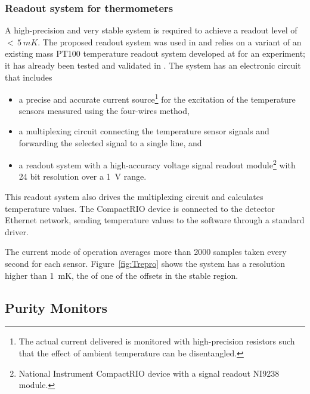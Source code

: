 \subsubsection{Readout system for thermometers}
\label{sec:fdgen-slow-cryo-therm-readout}

A %
high-precision and very stable system is required to achieve a readout level of $<\,\SI{5}{mK}$.
The proposed readout system was used in  and relies on a variant of an existing mass PT100 temperature readout system developed at
 for an  experiment; it has already been tested and validated in .
The system has an electronic circuit that includes
\begin{itemize}
\item a precise and accurate current source\footnote{The actual current delivered is monitored with high-precision resistors such that the effect of ambient temperature can be disentangled.} for the excitation of the temperature sensors measured using the four-wires method, 
\item a multiplexing circuit connecting the temperature sensor signals and forwarding the selected signal to a single line, and 
\item a readout system  with a high-accuracy voltage signal readout module\footnote{National Instrument CompactRIO\texttrademark{} device  with a signal readout NI9238\texttrademark{} module.} with 24 bit resolution over a \SI{1}{V} range.
\end{itemize}
This readout system also drives the multiplexing circuit and calculates temperature values. The CompactRIO device is connected to the detector Ethernet network, sending temperature values to the  software through a standard  driver.


The current mode of operation averages more than \num{2000} samples taken every second for each sensor. 
Figure~\ref{fig:Trepro} shows the system has a resolution higher than 
\SI{1}{mK}, the  of one of the offsets in the stable region.



\subsection{Purity Monitors}
\label{sec:fdgen-slow-cryo-purity-mon}

